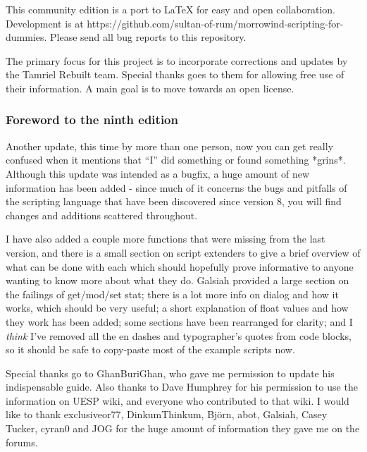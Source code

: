 \documentclass[oneside]{article}
\begin{document}
This community edition is a port to LaTeX for easy and open collaboration. Development is at https://github.com/sultan-of-rum/morrowind-scripting-for-dummies. Please send all bug reports to this repository.

The primary focus for this project is to incorporate corrections and updates by the Tamriel Rebuilt team. Special thanks goes to them for allowing free use of their information. A main goal is to move towards an open license. %

\hypertarget{foreword-to-the-ninth-edition}{%
\subsubsection{\texorpdfstring{\hfill\break
Foreword to the ninth edition}{Foreword to the ninth edition}}\label{foreword-to-the-ninth-edition}}

Another update, this time by more than one person, now you can get really confused when it mentions that ``I'' did something or found something *grins*. Although this update was intended as a bugfix, a huge amount of new information has been added - since much of it concerns the bugs and pitfalls of the scripting language that have been discovered since version 8, you will find changes and additions scattered throughout.

I have also added a couple more functions that were missing from the last version, and there is a small section on script extenders to give a brief overview of what can be done with each which should hopefully prove informative to anyone wanting to know more about what they do. Galsiah provided a large section on the failings of get/mod/set stat; there is a lot more info on dialog and how it works, which should be very useful; a short explanation of float values and how they work has
been added; some sections have been rearranged for clarity; and I \emph{think} I've removed all the en dashes and typographer's quotes from code blocks, so it should be safe to copy-paste most of the example scripts now.

Special thanks go to GhanBuriGhan, who gave me permission to update his indispensable guide. Also thanks to Dave Humphrey for his permission to use the information on UESP wiki, and everyone who contributed to that wiki. I would like to thank exclusiveor77, DinkumThinkum, Björn, abot, Galsiah, Casey Tucker, cyran0 and JOG for the huge amount of information they gave me on the forums.
\end{document}
